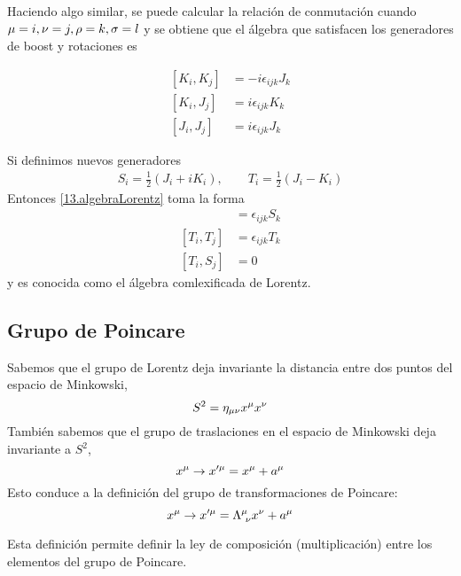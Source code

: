 Haciendo algo similar, se puede calcular la relación de conmutación cuando $\mu=i,\nu=j,\rho=k,\sigma=l$ y se obtiene que el álgebra que satisfacen los generadores de boost y rotaciones es
\begin{tcolorbox}
\begin{equation}\label{13.algebraLorentz}
\begin{split}
  [K_i,K_j]&=-i\epsilon_{ijk}J_k\\
  [K_i,J_j]&=i\epsilon_{ijk}K_k\\
  [J_i,J_j]&=i\epsilon_{ijk}J_k
\end{split}
\end{equation}
\end{tcolorbox}

Si definimos nuevos generadores
\begin{align}
  S_i=\frac{1}{2}(J_i+iK_i),\qquad T_i=\frac{1}{2}(J_i-K_i)
\end{align}
Entonces \eqref{13.algebraLorentz} toma la forma
\begin{align}
  [S_i,S_j]&=\epsilon_{ijk}S_k\\
  [T_i,T_j]&=\epsilon_{ijk}T_k\\
  [T_i,S_j]&=0
\end{align}
y es conocida como el álgebra comlexificada de Lorentz.

\subsection{Grupo de Poincare}
Sabemos que el grupo de Lorentz deja invariante la distancia entre dos puntos del espacio de Minkowski,
\begin{equation}
  S^2=\eta_{\mu\nu }x^\mu x^\nu 
\end{equation}
También sabemos que el grupo de traslaciones en el espacio de Minkowski deja invariante a $S^2$,
\begin{equation}
  x^\mu \to x'^\mu =x^\mu +a^\mu 
\end{equation}
Esto conduce a la definición del grupo de transformaciones de Poincare:
\begin{equation}
  x^\mu \to x'^\mu =\Lambda^\mu_{~\nu } x^\nu +a^\mu 
\end{equation}

Esta definición permite definir la ley de composición (multiplicación) entre los elementos del grupo de Poincare.


